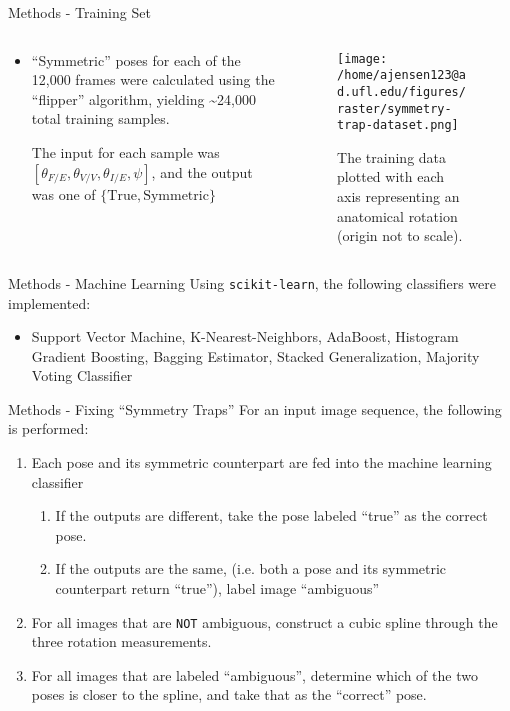 \documentclass[presentation, aspectratio=1610]{beamer}
\begin{document}
\begin{frame}[label={sec:org1769a81}]{Methods - Training Set}
\begin{columns}
\begin{column}{0.5\columnwidth}
\begin{itemize}
\item ``Symmetric'' poses for each of the 12,000 frames were calculated using the ``flipper'' algorithm, yielding \textasciitilde{}24,000 total training samples.

The input for each sample was \([\theta_{F/E}, \theta_{V/V}, \theta_{I/E}, \psi]\), and the output was one of \(\{\text{True}, \text{Symmetric}\}\)
\end{itemize}
\end{column}
\begin{column}{0.5\columnwidth}
\begin{figure}[htbp]
\centering
\texttt{[image: /home/ajensen123@ad.ufl.edu/figures/raster/symmetry-trap-dataset.png]}
\caption{The training data plotted with each axis representing an anatomical rotation (origin not to scale).}
\end{figure}
\end{column}
\end{columns}
\end{frame}
\begin{frame}[label={sec:orgcb192f1}]{Methods - Machine Learning}
Using \texttt{scikit-learn}, the following classifiers were implemented:

\begin{itemize}
\item Support Vector Machine, K-Nearest-Neighbors, AdaBoost, Histogram Gradient Boosting, Bagging Estimator, Stacked Generalization, Majority Voting Classifier
\end{itemize}
\end{frame}
\begin{frame}[label={sec:org0099d80},fragile]{Methods - Fixing ``Symmetry Traps''}
 For an input image sequence, the following is performed:

\begin{enumerate}
\item Each pose and its symmetric counterpart are fed into the machine learning classifier
\begin{enumerate}
\item If the outputs are different, take the pose labeled ``true'' as the correct pose.
\item If the outputs are the same, (i.e. both a pose and its symmetric counterpart return ``true''), label image ``ambiguous''
\end{enumerate}
\item For all images that are \texttt{NOT} ambiguous, construct a cubic spline through the three rotation measurements.
\item For all images that are labeled ``ambiguous'', determine which of the two poses is closer to the spline, and take that as the ``correct'' pose.
\end{enumerate}
\end{frame}
\end{document}
